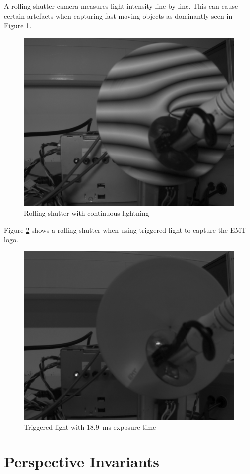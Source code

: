 \documentclass[
a4paper,     %
11pt         %
]{scrartcl}  %
\begin{document}
A rolling shutter camera measures light intensity line by line.
This can cause certain artefacts when capturing fast moving objects as dominantly seen in Figure \ref{fig:rolling_shuter_cont_light}.

\begin{figure}[H]
 \centering
 \includegraphics[width=.6\linewidth]{./Bildg_Messtechnik_Lab/SensorDynamics/rolling_shuter_cont_light.png}
 \caption{Rolling shutter with continuous lightning}
 \label{fig:rolling_shuter_cont_light}
\end{figure}

Figure \ref{fig:triggered_light_rolling_shutter} shows a rolling shutter when using triggered light to capture the EMT logo.

\begin{figure}[H]
 \centering
 \includegraphics[width=.6\linewidth]{./Bildg_Messtechnik_Lab/SensorDynamics/triggered_light_rolling_shutter.png}
 \caption{Triggered light with \SI{18.9}{ms} exposure time}
 \label{fig:triggered_light_rolling_shutter}
\end{figure}


\pagebreak
\section{Perspective Invariants}
\end{document}
